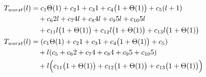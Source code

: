 \begin{subequations}
\label{eq:findlinescorners-1}
\begin{align}
\label{eq:findlinescorners-1-1}
T_{worst}(l)& =
c_{1}\Theta(1)
+ c_{2}1
+ c_{3}1
+ c_{4}\bigl(1 + \Theta(1)\bigr)
+ c_{5}(l + 1)
\\
& \quad
+ c_{6}2l
+ c_{7}4l
+ c_{8}4l
+ c_{9}5l
+ c_{10}5l
\nonumber \\
& \quad
+ c_{11}l\bigl(1 + \Theta(1)\bigr)
+ c_{12}l\bigl(1 + \Theta(1)\bigr)
+ c_{13}l\bigl(1 + \Theta(1)\bigr)
\nonumber \\
\label{eq:findlinescorners-1-2}
T_{worst}(l)& =
(c_{1}\Theta(1) + c_{2}1 + c_{3}1 + c_{4}\bigl(1 + \Theta(1)\bigr) + c_{5})
\\
& \quad
+ l(c_{5} + c_{6}2 + c_{7}4 + c_{8}4 + c_{9}5 + c_{10}5)
\nonumber \\
& \quad
+ l\Bigl(c_{11}\bigl(1 + \Theta(1)\bigr) + c_{12}\bigl(1 + \Theta(1)\bigr) + c_{13}\bigl(1 + \Theta(1)\bigr)\Bigr)
\nonumber
\end{align}
\end{subequations}
